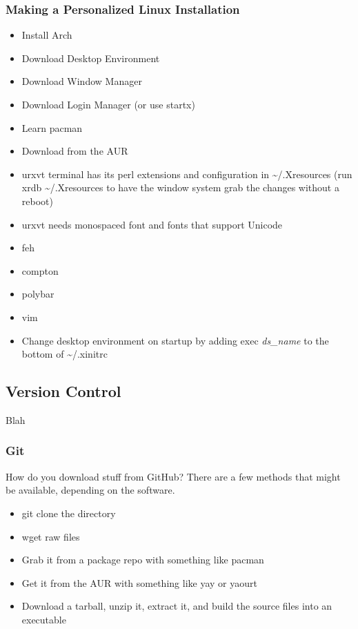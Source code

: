 \subsubsection{Making a Personalized Linux Installation}

\begin{itemize}
	\item Install Arch
	\item Download Desktop Environment
	\item Download Window Manager
	\item Download Login Manager (or use startx)
	\item Learn pacman
	\item Download from the AUR
	\item urxvt terminal has its perl extensions and configuration in \textasciitilde/.Xresources (run xrdb \textasciitilde/.Xresources to have the window system grab the changes without a reboot)
	\item urxvt needs monospaced font and fonts that support Unicode
	\item feh
	\item compton
	\item polybar
	\item vim
	\item Change desktop environment on startup by adding exec \textit{ds\_name} to the bottom of \textasciitilde/.xinitrc
\end{itemize}


\subsection{Version Control}

Blah

\subsubsection{Git}

How do you download stuff from GitHub? There are a few methods that might be available, depending on the software.
\begin{itemize}
	\item git clone the directory
	\item wget raw files
	\item Grab it from a package repo with something like pacman
	\item Get it from the AUR with something like yay or yaourt
	\item Download a tarball, unzip it, extract it, and build the source files into an executable
\end{itemize}

